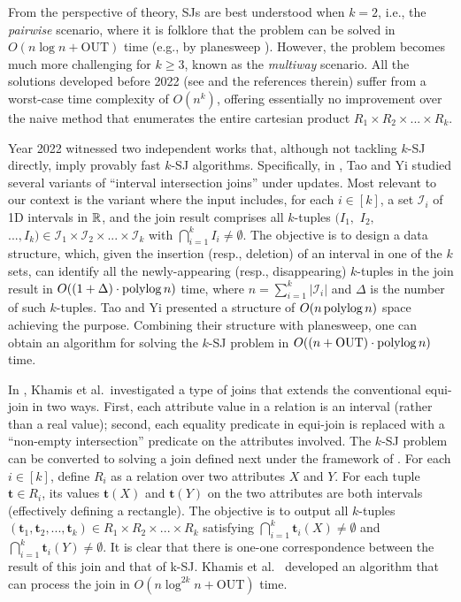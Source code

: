 \documentclass[sigconf]{acmart}
\def\vgap{\vspace{1mm}}
\def\I{\mathcal{I}}
\def\out{\mathrm{OUT}}
\begin{document}
\vgap

From the perspective of theory, SJs are best understood when $k = 2$, i.e., the {\em pairwise} scenario, where it is folklore that the problem can be solved in $O(n \log n + \out)$ time (e.g., by planesweep \cite{bcko08}). However, the problem becomes much more challenging for $k \ge 3$, known as the {\em multiway} scenario. All the solutions developed  before 2022 (see \cite{gcn+13,mp98,mp01,pmt99} and the references therein) suffer from a worst-case time complexity of $O(n^k)$, offering essentially no improvement over the naive method that enumerates the entire cartesian product $R_1 \times R_2 \times ... \times R_k$.

\vgap

Year 2022 witnessed two independent works \cite{ty22,kcko22} that, although not tackling $k$-SJ directly, imply provably fast $k$-SJ algorithms. Specifically, in \cite{ty22}, Tao and Yi studied several variants of ``interval intersection joins'' under updates. Most relevant to our context is the variant where the input includes, for each $i \in [k]$, a set $\I_i$ of 1D intervals in $\mathbb{R}$, and the join result comprises all $k$-tuples $(I_1,$ $I_2,$ $..., I_k) \in \I_1 \times \I_2 \times ... \times \I_k$ with $\bigcap_{i=1}^k I_i \neq \emptyset$. The objective is to design a data structure, which, given the insertion (resp., deletion) of an interval in one of the $k$ sets, can identify all the newly-appearing (resp., disappearing) $k$-tuples in the join result in $O((1+\Delta) \cdot \operatorname*{polylog} n)$ time, where $n = \sum_{i=1}^k |\I_i|$ and $\Delta$ is the number of such $k$-tuples. Tao and Yi \cite{ty22} presented a structure of $O(n \operatorname*{polylog} n)$ space achieving the purpose. Combining their structure with planesweep, one can obtain an algorithm for solving the $k$-SJ problem in $O((n + \out) \cdot \polylog n)$ time.

\vgap

In \cite{kcko22}, Khamis et al.\ investigated a type of joins that extends the conventional equi-join in two ways. First, each attribute value in a relation is an interval (rather than a real value); second, each equality predicate in equi-join is replaced with a ``non-empty intersection'' predicate on the attributes involved. The $k$-SJ problem can be converted to solving a join defined next under the framework of \cite{kcko22}. For each $i \in [k]$, define $R_i$ as a relation over two attributes $X$ and $Y$. For each tuple $\bm{t} \in R_i$, its values $\bm{t}(X)$ and $\bm{t}(Y)$ on the two attributes are both intervals (effectively defining a rectangle). The objective is to output all $k$-tuples $(\bm{t}_1, \bm{t}_2, ..., \bm{t}_k) \in R_1 \times R_2 \times ... \times R_k$ satisfying $\bigcap_{i=1}^k \bm{t}_i(X) \ne \emptyset$ and $\bigcap_{i=1}^k \bm{t}_i(Y) \ne \emptyset$. It is clear that there is one-one correspondence between the result of this join and that of k-SJ. Khamis et al.\ \cite{kcko22} developed an algorithm that can process the join  in $O(n \log^{2k} n + \out)$ time.
\end{document}
